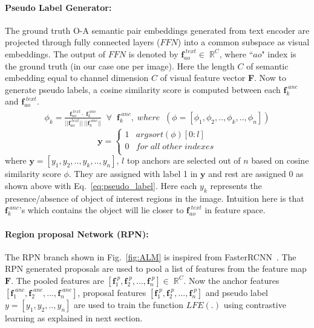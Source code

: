 \documentclass{bmvc2k}
\begin{document}
\paragraph{Pseudo Label Generator:} The ground truth O-A semantic pair embeddings generated from text encoder are projected through fully connected layers ($FFN$) into a common subspace as visual embeddings. The output of $FFN$ is denoted by $\textbf{f}^{\;text}_{ao} \in \; \mathbb{R}^{C}$, where ``$ao$" index is the ground truth (in our case one per image). Here the length $C$ of semantic embedding equal to channel dimension $C$ of visual feature vector \textbf{F}. Now to generate pseudo labels, a cosine similarity score is computed between each $\textbf{f}^{\;anc}_k$ and $\textbf{f}^{\;text}_{ao}$.
\begin{equation}
    \begin{split}
        \phi_{k} = \frac{\textbf{f}^ {\;text}_{ao}\cdot\;\textbf{f}^{\;anc}_k}{||\textbf{f}^{\;text}_{ao}||\;||\textbf{f}^{\;anc}_k||}\; \; \forall \;\; \textbf{f}^{\;anc}_k, \;where\;\; (\phi = [\phi_1, \phi_2, .., \phi_k, .., \phi_n])
    \end {split}
    \label{eq:pseudo_label1}
\end{equation}
\vspace{-0.2cm}
\begin{equation}
  \textbf{y} =
    \begin{cases}
      1 & argsort(\phi)[0:l]\\
      0 & for\; all\; other\;indexes\\
    \end{cases}
    \label{eq:pseudo_label}
\end{equation}
where $\mathbf{y} = [y_1, y_2, .., y_k, .., y_n]$, $l$ top anchors are selected out of $n$ based on cosine similarity score $\phi$. 
They are assigned with label 1 in $\mathbf{y}$ and rest are assigned 0 as shown above with Eq.~\ref{eq:pseudo_label}. Here each $y_k$ represents the presence/absence of object of interest regions in the image.
Intuition here is that $\textbf{f}^{\;anc}_k$'s which contains the object will lie closer to $\textbf{f}^{\;text}_{ao}$ in feature space.

\vspace{-0.2cm}
\paragraph{Region proposal Network (RPN):} The RPN branch shown in Fig.~\ref{fig:ALM} is inspired from FasterRCNN~\cite{ren2015faster}. 
The RPN generated proposals are used to pool a list of features from the feature map $\textbf{F}$. The pooled features are  $[\textbf{f}^{\;p}_1, \textbf{f}^{\;p}_2, ..., \textbf{f}^{\;p}_n]  \in \; \mathbb{R}^{C}$. Now the anchor features $[\textbf{f}^{\;anc}_1, \textbf{f}^{\;anc}_2, ..., \textbf{f}^{\;anc}_n]$, proposal features $[\textbf{f}^{\;p}_1, \textbf{f}^{\;p}_2, ..., \textbf{f}^{\;p}_n]$ and pseudo label $y=[y_1, y_2, .., y_n]$ are used to train the function $LFE(.)$ using contrastive learning as explained in next section.
\end{document}
